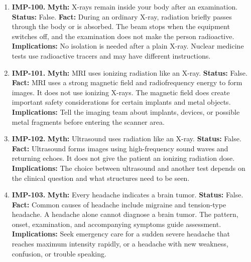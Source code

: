 \documentclass[11pt,oneside]{book}
\begin{document}
\begin{enumerate}[leftmargin=0pt,labelwidth=0pt,labelsep=0pt,itemindent=0pt]
\textbf{Implications:} Persistent fatigue deserves assessment of its cause. Extra vitamins do not substitute for adequate food or sleep.
\item[] \textbf{IMP-100.} \textbf{Myth:} X-rays remain inside your body after an examination.\newline
\textbf{Status:} False.\newline
\textbf{Fact:} During an ordinary X-ray, radiation briefly passes through the body or is absorbed. The beam stops when the equipment switches off, and the examination does not make the person radioactive. \cite{ref435}\newline
\textbf{Implications:} No isolation is needed after a plain X-ray. Nuclear medicine tests use radioactive tracers and may have different instructions.
\item[] \textbf{IMP-101.} \textbf{Myth:} MRI uses ionizing radiation like an X-ray.\newline
\textbf{Status:} False.\newline
\textbf{Fact:} MRI uses a strong magnetic field and radiofrequency energy to form images. It does not use ionizing X-rays. The magnetic field does create important safety considerations for certain implants and metal objects. \cite{ref435,ref436}\newline
\textbf{Implications:} Tell the imaging team about implants, devices, or possible metal fragments before entering the scanner area.
\item[] \textbf{IMP-102.} \textbf{Myth:} Ultrasound uses radiation like an X-ray.\newline
\textbf{Status:} False.\newline
\textbf{Fact:} Ultrasound forms images using high-frequency sound waves and returning echoes. It does not give the patient an ionizing radiation dose. \cite{ref435}\newline
\textbf{Implications:} The choice between ultrasound and another test depends on the clinical question and what structures need to be seen.
\item[] \textbf{IMP-103.} \textbf{Myth:} Every headache indicates a brain tumor.\newline
\textbf{Status:} False.\newline
\textbf{Fact:} Common causes of headache include migraine and tension-type headache. A headache alone cannot diagnose a brain tumor. The pattern, onset, examination, and accompanying symptoms guide assessment. \cite{ref437}\newline
\textbf{Implications:} Seek emergency care for a sudden severe headache that reaches maximum intensity rapidly, or a headache with new weakness, confusion, or trouble speaking.

\end{enumerate}
\end{document}
